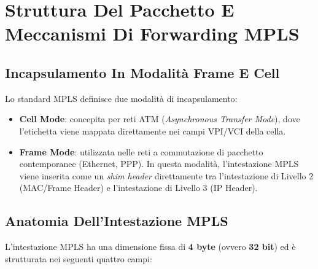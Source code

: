 \documentclass[11pt, a4paper]{article}
\begin{document}
\newpage

\section{Struttura Del Pacchetto E Meccanismi Di Forwarding MPLS}

\subsection{Incapsulamento In Modalità Frame E Cell}
Lo standard MPLS definisce due modalità di incapsulamento:
\begin{itemize}[noitemsep]
    \item \textbf{Cell Mode}: concepita per reti ATM (\emph{Asynchronous Transfer Mode}), dove l'etichetta viene mappata direttamente nei campi VPI/VCI della cella.
    \item \textbf{Frame Mode}: utilizzata nelle reti a commutazione di pacchetto contemporanee (Ethernet, PPP). In questa modalità, l'intestazione MPLS viene inserita come un \emph{shim header} direttamente tra l'intestazione di Livello 2 (MAC/Frame Header) e l'intestazione di Livello 3 (IP Header).
\end{itemize}


\subsection{Anatomia Dell'Intestazione MPLS}
L'intestazione MPLS ha una dimensione fissa di \textbf{4 byte} (ovvero \textbf{32 bit}) ed è strutturata nei seguenti quattro campi:

\end{document}
